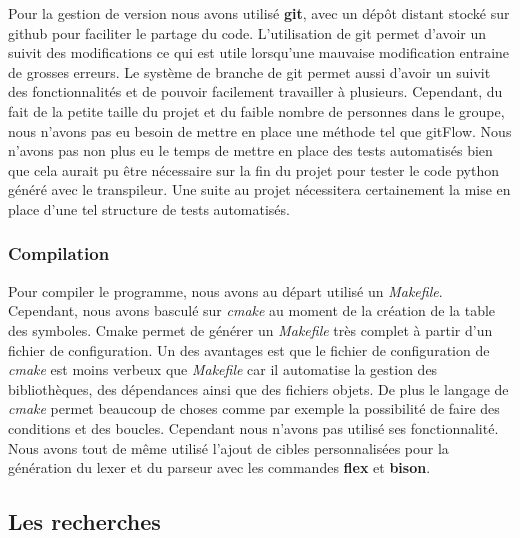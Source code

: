 \documentclass[a4paper]{article}%
\begin{document}
Pour la gestion de version nous avons utilisé \textbf{git}, avec un dépôt
distant stocké sur github pour faciliter le partage du code. L'utilisation de
git permet d'avoir un suivit des modifications ce qui est utile lorsqu'une
mauvaise modification entraine de grosses erreurs. Le système de branche de git
permet aussi d'avoir un suivit des fonctionnalités et de pouvoir facilement
travailler à plusieurs. Cependant, du fait de la petite taille du projet et du
faible nombre de personnes dans le groupe, nous n'avons pas eu besoin de mettre
en place une méthode tel que gitFlow. Nous n'avons pas non plus eu le temps de
mettre en place des tests automatisés bien que cela aurait pu être nécessaire
sur la fin du projet pour tester le code python généré avec le transpileur. Une
suite au projet nécessitera certainement la mise en place d'une tel structure de
tests automatisés.\\

\subsubsection{Compilation}

Pour compiler le programme, nous avons au départ utilisé un \textit{Makefile}.
Cependant, nous avons basculé sur \textit{cmake} au moment de la création de la
table des symboles. Cmake permet de générer un \textit{Makefile} très complet à
partir d'un fichier de configuration. Un des avantages est que le fichier de
configuration de \textit{cmake} est moins verbeux que \textit{Makefile} car il
automatise la gestion des bibliothèques, des dépendances ainsi que des fichiers
objets. De plus le langage de \textit{cmake} permet beaucoup de choses comme par
exemple la possibilité de faire des conditions et des boucles. Cependant nous
n'avons pas utilisé ses fonctionnalité. Nous avons tout de même utilisé l'ajout
de cibles personnalisées pour la génération du \gls{lexer} et du parseur avec les
commandes \textbf{flex} et \textbf{bison}.

\subsection{Les recherches}
\end{document}
